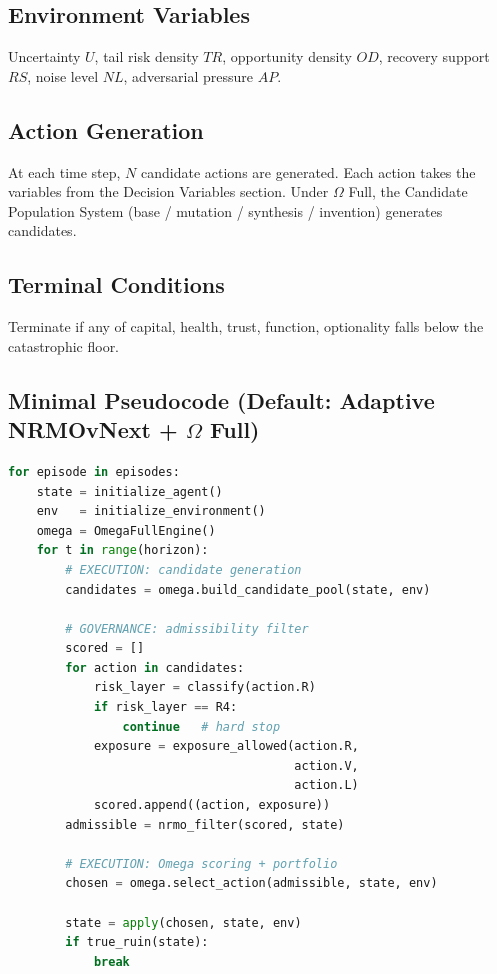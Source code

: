 \subsection{Environment Variables}
\label{sec:omega-environment-vars}

Uncertainty $U$, tail risk density $\mathit{TR}$, opportunity
density $\mathit{OD}$, recovery support $\mathit{RS}$, noise level
$\mathit{NL}$, adversarial pressure $\mathit{AP}$.

\subsection{Action Generation}
\label{sec:omega-action-generation}

At each time step, $N$ candidate actions are generated. Each action
takes the variables from the Decision Variables section. Under
$\Omega$ Full, the Candidate Population System
(base / mutation / synthesis / invention) generates candidates.

\subsection{Terminal Conditions}
\label{sec:omega-terminal-conditions}

Terminate if any of capital, health, trust, function, optionality
falls below the catastrophic floor.

\subsection{Minimal Pseudocode (Default: Adaptive NRMOvNext +
$\Omega$ Full)}
\label{sec:omega-individual-pseudo}

\begin{lstlisting}[language=Python,basicstyle=\ttfamily\scriptsize,frame=single]
for episode in episodes:
    state = initialize_agent()
    env   = initialize_environment()
    omega = OmegaFullEngine()
    for t in range(horizon):
        # EXECUTION: candidate generation
        candidates = omega.build_candidate_pool(state, env)

        # GOVERNANCE: admissibility filter
        scored = []
        for action in candidates:
            risk_layer = classify(action.R)
            if risk_layer == R4:
                continue   # hard stop
            exposure = exposure_allowed(action.R,
                                        action.V,
                                        action.L)
            scored.append((action, exposure))
        admissible = nrmo_filter(scored, state)

        # EXECUTION: Omega scoring + portfolio
        chosen = omega.select_action(admissible, state, env)

        state = apply(chosen, state, env)
        if true_ruin(state):
            break
\end{lstlisting}


